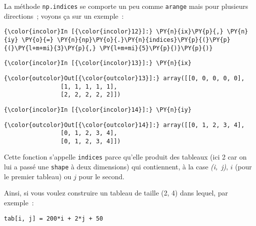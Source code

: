     La méthode \texttt{np.indices} se comporte un peu comme \texttt{arange}
mais pour plusieurs directions~; voyons ça sur un exemple~:

    \begin{Verbatim}[commandchars=\\\{\},frame=single,framerule=0.3mm,rulecolor=\color{cellframecolor}]
{\color{incolor}In [{\color{incolor}12}]:} \PY{n}{ix}\PY{p}{,} \PY{n}{iy} \PY{o}{=} \PY{n}{np}\PY{o}{.}\PY{n}{indices}\PY{p}{(}\PY{p}{(}\PY{l+m+mi}{3}\PY{p}{,} \PY{l+m+mi}{5}\PY{p}{)}\PY{p}{)}
\end{Verbatim}


    \begin{Verbatim}[commandchars=\\\{\},frame=single,framerule=0.3mm,rulecolor=\color{cellframecolor}]
{\color{incolor}In [{\color{incolor}13}]:} \PY{n}{ix}
\end{Verbatim}


\begin{Verbatim}[commandchars=\\\{\},frame=single,framerule=0.3mm,rulecolor=\color{cellframecolor}]
{\color{outcolor}Out[{\color{outcolor}13}]:} array([[0, 0, 0, 0, 0],
                [1, 1, 1, 1, 1],
                [2, 2, 2, 2, 2]])
\end{Verbatim}
            
    \begin{Verbatim}[commandchars=\\\{\},frame=single,framerule=0.3mm,rulecolor=\color{cellframecolor}]
{\color{incolor}In [{\color{incolor}14}]:} \PY{n}{iy}
\end{Verbatim}


\begin{Verbatim}[commandchars=\\\{\},frame=single,framerule=0.3mm,rulecolor=\color{cellframecolor}]
{\color{outcolor}Out[{\color{outcolor}14}]:} array([[0, 1, 2, 3, 4],
                [0, 1, 2, 3, 4],
                [0, 1, 2, 3, 4]])
\end{Verbatim}
            
    Cette fonction s'appelle \texttt{indices} parce qu'elle produit des
tableaux (ici 2 car on lui a passé une \texttt{shape} à deux dimensions)
qui contiennent, à la case \emph{(i,~j)}, \(i\) (pour le premier
tableau) ou \(j\) pour le second.

    Ainsi, si vous voulez construire un tableau de taille (2, 4) dans
lequel, par exemple~:

\begin{verbatim}
tab[i, j] = 200*i + 2*j + 50
\end{verbatim}


